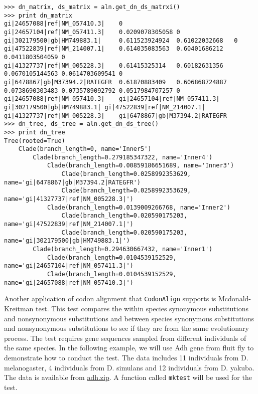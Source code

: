 \documentclass{article}
\begin{document}
\begin{verbatim}
>>> dn_matrix, ds_matrix = aln.get_dn_ds_matrxi()
>>> print dn_matrix
gi|24657088|ref|NM_057410.3|    0
gi|24657104|ref|NM_057411.3|    0.0209078305058 0
gi|302179500|gb|HM749883.1|     0.611523924924  0.61022032668   0
gi|47522839|ref|NM_214007.1|    0.614035083563  0.60401686212   0.0411803504059 0
gi|41327737|ref|NM_005228.3|    0.61415325314   0.60182631356   0.0670105144563 0.0614703609541 0
gi|6478867|gb|M37394.2|RATEGFR  0.61870883409   0.606868724887  0.0738690303483 0.0735789092792 0.0517984707257 0
gi|24657088|ref|NM_057410.3|    gi|24657104|ref|NM_057411.3|    gi|302179500|gb|HM749883.1| gi|47522839|ref|NM_214007.1|    gi|41327737|ref|NM_005228.3|    gi|6478867|gb|M37394.2|RATEGFR
>>> dn_tree, ds_tree = aln.get_dn_ds_tree()
>>> print dn_tree
Tree(rooted=True)
    Clade(branch_length=0, name='Inner5')
        Clade(branch_length=0.279185347322, name='Inner4')
            Clade(branch_length=0.00859186651689, name='Inner3')
                Clade(branch_length=0.0258992353629, name='gi|6478867|gb|M37394.2|RATEGFR')
                Clade(branch_length=0.0258992353629, name='gi|41327737|ref|NM_005228.3|')
            Clade(branch_length=0.0139009266768, name='Inner2')
                Clade(branch_length=0.020590175203, name='gi|47522839|ref|NM_214007.1|')
                Clade(branch_length=0.020590175203, name='gi|302179500|gb|HM749883.1|')
        Clade(branch_length=0.294630667432, name='Inner1')
            Clade(branch_length=0.0104539152529, name='gi|24657104|ref|NM_057411.3|')
            Clade(branch_length=0.0104539152529, name='gi|24657088|ref|NM_057410.3|')
\end{verbatim}

Another application of codon alignment that \texttt{CodonAlign} supports
is Mcdonald-Kreitman test. This test compares the within species
synonymous substitutions and nonsynonymous substitutions and between
species synonymous substitutions and nonsynonymous substitutions to see
if they are from the same evolutionary process. The test requires gene
sequences sampled from different individuals of the same species. In the
following example, we will use Adh gene from fluit fly to demonstrate
how to conduct the test. The data includes 11 individuals from
D. melanogaster, 4 individuals from D. simulans and 12 individuals from
D. yakuba. The data is available from
\href{http://zruanweb.com/adh.zip}{adh.zip}. A function called
\texttt{mktest} will be used for the test.
\end{document}
